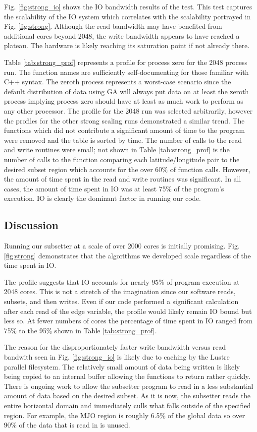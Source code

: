 Fig. \ref{fig:strong_io} shows the IO bandwidth results of the test.  This test
captures the scalability of the IO system which correlates with the scalability
portrayed in Fig. \ref{fig:strong}.  Although the read bandwidth may have
benefited from additional cores beyond 2048, the write bandwidth appears to
have reached a plateau.  The hardware is likely reaching its saturation point
if not already there.

Table \ref{tab:strong_prof} represents a profile for process zero for the 2048
process run.  The function names are sufficiently self-documenting for those
familiar with C++ syntax.  The zeroth process represents a worst-case scenario
since the default distribution of data using GA will always put data on at
least the zeroth process implying process zero should have at least as much
work to perform as any other processor.  The profile for the 2048 run was
selected arbitrarily, however the profiles for the other strong scaling runs
demonstrated a similar trend.  The functions which did not contribute a
significant amount of time to the program were removed and the table is sorted
by time.  The number of calls to the read and write routines were small; not
shown in Table \ref{tab:strong_prof} is the number of calls to the function
comparing each latitude/longitude pair to the desired subset region which
accounts for the over 60\% of function calls.  However, the amount of time
spent in the read and write routines was significant.  In all cases, the
amount of time spent in IO was at least 75\% of the program's execution.  IO
is clearly the dominant factor in running our code.

\subsection{Discussion}

Running our subsetter at a scale of over 2000 cores is initially promising.
Fig. \ref{fig:strong} demonstrates that the algorithms we developed scale
regardless of the time spent in IO.

The profile suggests that IO accounts for nearly 95\% of program execution at
2048 cores.  This is not a stretch of the imagination since our software reads,
subsets, and then writes.  Even if our code performed a significant calculation
after each read of the edge variable, the profile would likely remain IO bound
but less so.  At fewer numbers of cores the percentage of time spent in IO
ranged from 75\% to the 95\% shown in Table \ref{tab:strong_prof}.

The reason for the disproportionately faster write bandwidth versus read
bandwith seen in Fig. \ref{fig:strong_io} is likely due to caching by the
Lustre parallel filesystem.  The relatively small amount of data being written
is likely being copied to an internal buffer allowing the functions to return
rather quickly.  There is ongoing work to allow the subsetter program to read
in a less substantial amount of data based on the desired subset.  As it is
now, the subsetter reads the entire horizontal domain and immediately culls
what falls outside of the specified region.  For example, the MJO region is
roughly 6.5\% of the global data so over 90\% of the data that is read in is
unused.
